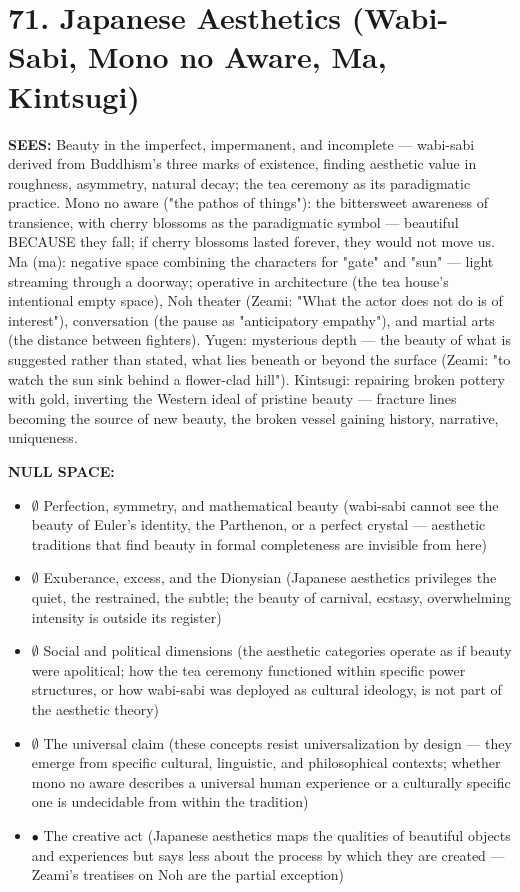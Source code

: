 \bigskip\noindent\makebox[\textwidth]{\color{rulegray}\rule{5cm}{0.3pt}}\bigskip


\section*{71. Japanese Aesthetics (Wabi-Sabi, Mono no Aware, Ma, Kintsugi)}


\textbf{SEES:} Beauty in the imperfect, impermanent, and incomplete — wabi-sabi derived from Buddhism's three marks of existence, finding aesthetic value in roughness, asymmetry, natural decay; the tea ceremony as its paradigmatic practice. Mono no aware ("the pathos of things"): the bittersweet awareness of transience, with cherry blossoms as the paradigmatic symbol — beautiful BECAUSE they fall; if cherry blossoms lasted forever, they would not move us. Ma ({ma}): negative space combining the characters for "gate" and "sun" — light streaming through a doorway; operative in architecture (the tea house's intentional empty space), Noh theater (Zeami: "What the actor does not do is of interest"), conversation (the pause as "anticipatory empathy"), and martial arts (the distance between fighters). Yugen: mysterious depth — the beauty of what is suggested rather than stated, what lies beneath or beyond the surface (Zeami: "to watch the sun sink behind a flower-clad hill"). Kintsugi: repairing broken pottery with gold, inverting the Western ideal of pristine beauty — fracture lines becoming the source of new beauty, the broken vessel gaining history, narrative, uniqueness.


\textbf{NULL SPACE:}

\begin{itemize}[nosep,leftmargin=*]
  \item $\emptyset$ Perfection, symmetry, and mathematical beauty (wabi-sabi cannot see the beauty of Euler's identity, the Parthenon, or a perfect crystal — aesthetic traditions that find beauty in formal completeness are invisible from here)
  \item $\emptyset$ Exuberance, excess, and the Dionysian (Japanese aesthetics privileges the quiet, the restrained, the subtle; the beauty of carnival, ecstasy, overwhelming intensity is outside its register)
  \item $\emptyset$ Social and political dimensions (the aesthetic categories operate as if beauty were apolitical; how the tea ceremony functioned within specific power structures, or how wabi-sabi was deployed as cultural ideology, is not part of the aesthetic theory)
  \item $\emptyset$ The universal claim (these concepts resist universalization by design — they emerge from specific cultural, linguistic, and philosophical contexts; whether mono no aware describes a universal human experience or a culturally specific one is undecidable from within the tradition)
  \item $\bullet$ The creative act (Japanese aesthetics maps the qualities of beautiful objects and experiences but says less about the process by which they are created — Zeami's treatises on Noh are the partial exception)
\end{itemize}


